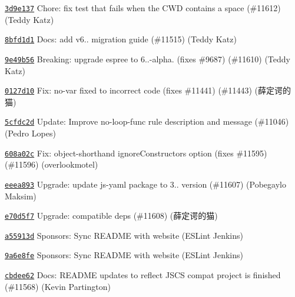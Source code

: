 \begin{DoxyItemize}
\item \href{https://github.com/eslint/eslint/commit/3d9e1372aad1e174b5438e3d6bd75fdefba06bad}{\texttt{ {\ttfamily 3d9e137}}} Chore\+: fix test that fails when the CWD contains a space (\#11612) (Teddy Katz)
\item \href{https://github.com/eslint/eslint/commit/8bfd1d138001d4493180b2fcff3330b42d0bb7cb}{\texttt{ {\ttfamily 8bfd1d1}}} Docs\+: add v6.. migration guide (\#11515) (Teddy Katz)
\item \href{https://github.com/eslint/eslint/commit/9e49b56c08fd0e449fddab45dfeb0da8d918b460}{\texttt{ {\ttfamily 9e49b56}}} Breaking\+: upgrade espree to 6..-\/alpha. (fixes \#9687) (\#11610) (Teddy Katz)
\item \href{https://github.com/eslint/eslint/commit/0127d107590acabfdea4a68b56acbeee6a7b9daa}{\texttt{ {\ttfamily 0127d10}}} Fix\+: no-\/var fixed to incorrect code (fixes \#11441) (\#11443) (薛定谔的猫)
\item \href{https://github.com/eslint/eslint/commit/5cfdc2d08307c63bec487e76d2f470ef84166867}{\texttt{ {\ttfamily 5cfdc2d}}} Update\+: Improve no-\/loop-\/func rule description and message (\#11046) (Pedro Lopes)
\item \href{https://github.com/eslint/eslint/commit/608a02c60656b96c3219d342eee7e98b55bdd580}{\texttt{ {\ttfamily 608a02c}}} Fix\+: object-\/shorthand ignore\+Constructors option (fixes \#11595) (\#11596) (overlookmotel)
\item \href{https://github.com/eslint/eslint/commit/eeea89361d48494995446ddb6ee6f049457911ec}{\texttt{ {\ttfamily eeea893}}} Upgrade\+: update js-\/yaml package to 3.. version (\#11607) (Pobegaylo Maksim)
\item \href{https://github.com/eslint/eslint/commit/e70d5f7573a9641d7b63394df53a3ef86183445c}{\texttt{ {\ttfamily e70d5f7}}} Upgrade\+: compatible deps (\#11608) (薛定谔的猫)
\item \href{https://github.com/eslint/eslint/commit/a55913d6c6fd1a7c684b8b4d7ab380cf7dc83eb8}{\texttt{ {\ttfamily a55913d}}} Sponsors\+: Sync README with website (ESLint Jenkins)
\item \href{https://github.com/eslint/eslint/commit/9a6e8fe4b025d52275f7ad2959361587f476cc58}{\texttt{ {\ttfamily 9a6e8fe}}} Sponsors\+: Sync README with website (ESLint Jenkins)
\item \href{https://github.com/eslint/eslint/commit/cbdee6230d22522c37259449467ace16f28ea8e8}{\texttt{ {\ttfamily cbdee62}}} Docs\+: README updates to reflect JSCS compat project is finished (\#11568) (Kevin Partington)

\end{DoxyItemize}
